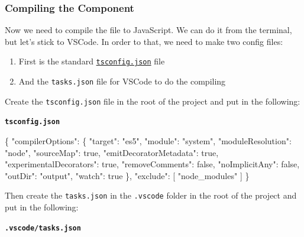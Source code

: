 \documentclass[12pt,]{article}
\newenvironment{Shaded}{}{}
\newcommand{\KeywordTok}[1]{\textcolor[rgb]{0.00,0.00,1.00}{{#1}}}
\newcommand{\DataTypeTok}[1]{{#1}}
\newcommand{\StringTok}[1]{\textcolor[rgb]{0.00,0.50,0.50}{{#1}}}
\newcommand{\OtherTok}[1]{\textcolor[rgb]{1.00,0.25,0.00}{{#1}}}
\newcommand{\FunctionTok}[1]{{#1}}
\begin{document}
\subsubsection{Compiling the Component}\label{compiling-the-component}

Now we need to compile the file to JavaScript. We can do it from the
terminal, but let's stick to VSCode. In order to that, we need to make
two config files:

\begin{enumerate}
\def\labelenumi{\arabic{enumi}.}
\item
  First is the standard
  \href{http://json.schemastore.org/tsconfig}{\texttt{tsconfig.json}}
  file
\item
  And the \texttt{tasks.json} file for VSCode to do the compiling
\end{enumerate}

Create the \texttt{tsconfig.json} file in the root of the project and
put in the following:

\textbf{\texttt{tsconfig.json}}

\begin{Shaded}
\begin{Highlighting}[numbers=left,,]
\FunctionTok{\{}
  \DataTypeTok{"compilerOptions"}\FunctionTok{:} \FunctionTok{\{}
    \DataTypeTok{"target"}\FunctionTok{:} \StringTok{"es5"}\FunctionTok{,}
    \DataTypeTok{"module"}\FunctionTok{:} \StringTok{"system"}\FunctionTok{,}
    \DataTypeTok{"moduleResolution"}\FunctionTok{:} \StringTok{"node"}\FunctionTok{,}
    \DataTypeTok{"sourceMap"}\FunctionTok{:} \KeywordTok{true}\FunctionTok{,}
    \DataTypeTok{"emitDecoratorMetadata"}\FunctionTok{:} \KeywordTok{true}\FunctionTok{,}
    \DataTypeTok{"experimentalDecorators"}\FunctionTok{:} \KeywordTok{true}\FunctionTok{,}
    \DataTypeTok{"removeComments"}\FunctionTok{:} \KeywordTok{false}\FunctionTok{,}
    \DataTypeTok{"noImplicitAny"}\FunctionTok{:} \KeywordTok{false}\FunctionTok{,}
    \DataTypeTok{"outDir"}\FunctionTok{:} \StringTok{"output"}\FunctionTok{,}
    \DataTypeTok{"watch"}\FunctionTok{:} \KeywordTok{true}
  \FunctionTok{\},}
  \DataTypeTok{"exclude"}\FunctionTok{:} \OtherTok{[}
    \StringTok{"node_modules"}
  \OtherTok{]}
\FunctionTok{\}}
\end{Highlighting}
\end{Shaded}

Then create the \texttt{tasks.json} in the \texttt{.vscode} folder in
the root of the project and put in the following:

\textbf{\texttt{.vscode/tasks.json}}
\end{document}
